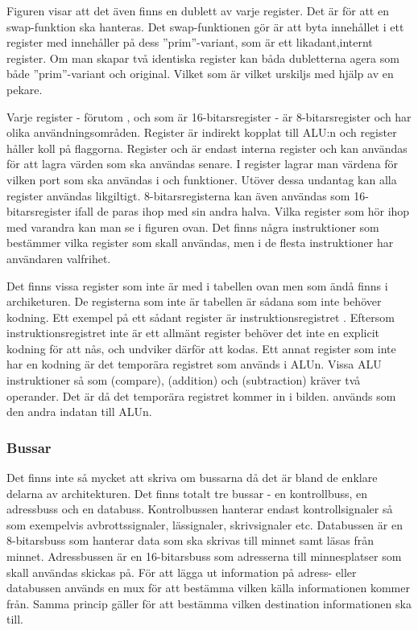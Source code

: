 \documentclass[main.tex]{subfiles}
\begin{document}
Figuren visar att det även finns en dublett av varje register. Det är för att
en swap-funktion ska hanteras. Det swap-funktionen gör är att byta innehållet i
ett register med innehåller på dess ''prim''-variant, som är ett
likadant,internt register. Om man skapar två identiska register kan båda
dubletterna agera som både ''prim''-variant och original. Vilket som är vilket
urskiljs med hjälp av en pekare.

Varje register - förutom ,  och  som är
16-bitarsregister - är 8-bitarsregister och har olika användningsområden.
Register  är indirekt kopplat till ALU:n och register  håller
koll på flaggorna. Register  och  är endast interna register
och kan användas för att lagra värden som ska användas senare. I register
 lagrar man värdena för vilken port som ska användas i  och
 funktioner. Utöver dessa undantag kan alla register användas
likgiltigt. 8-bitarsregisterna kan även användas som 16-bitarsregister ifall de
paras ihop med sin andra halva. Vilka register som hör ihop med varandra kan
man se i figuren ovan. Det finns några instruktioner som bestämmer vilka
register som skall användas, men i de flesta instruktioner har användaren
valfrihet.

Det finns vissa register som inte är med i tabellen ovan men som ändå finns i
archiketuren. De registerna som inte är tabellen är sådana som inte behöver
kodning. Ett exempel på ett sådant register är instruktionsregistret .
Eftersom instruktionsregistret inte är ett allmänt register behöver det inte en
explicit kodning för att nås, och undviker därför att kodas. Ett annat register
som inte har en kodning är det temporära registret som används i ALUn.  Vissa
ALU instruktioner så som  (compare),  (addition) och
 (subtraction) kräver två operander. Det är då det temporära
registret  kommer in i bilden.  används som den andra
indatan till ALUn.

\subsubsection{Bussar}
Det finns inte så mycket att skriva om bussarna då det är bland de enklare
delarna av architekturen. Det finns totalt tre bussar - en kontrollbuss, en
adressbuss och en databuss. Kontrolbussen hanterar endast kontrollsignaler så
som exempelvis avbrottssignaler, lässignaler, skrivsignaler etc. Databussen är
en 8-bitarsbuss som hanterar data som ska skrivas till minnet samt läsas från
minnet. Adressbussen är en 16-bitarsbuss som adresserna till minnesplatser som
skall användas skickas på. För att lägga ut information på adress- eller
databussen används en mux för att bestämma vilken källa informationen kommer
från. Samma princip gäller för att bestämma vilken destination informationen
ska till.
\end{document}
